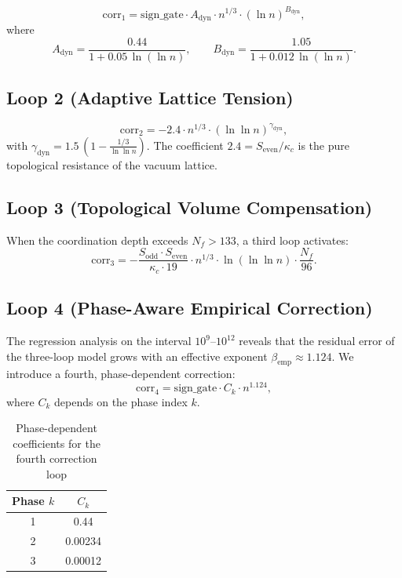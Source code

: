 \documentclass[12pt,a4paper]{article}
\theoremstyle{remark}
\newcommand{\kappac}{\kappa_c}
\newcommand{\Sodd}{S_{\mathrm{odd}}}
\newcommand{\Seven}{S_{\mathrm{even}}}
\begin{document}
	\[
	\mathrm{corr}_1 = \mathrm{sign\_gate} \cdot A_{\mathrm{dyn}} \cdot n^{1/3} \cdot (\ln n)^{B_{\mathrm{dyn}}},
	\]
	where
	\[
	A_{\mathrm{dyn}} = \frac{0.44}{1 + 0.05\,\ln(\ln n)}, \qquad
	B_{\mathrm{dyn}} = \frac{1.05}{1 + 0.012\,\ln(\ln n)}.
	\]
	
	\subsection{Loop 2 (Adaptive Lattice Tension)}
	
	\[
	\mathrm{corr}_2 = -2.4 \cdot n^{1/3} \cdot (\ln\ln n)^{\gamma_{\mathrm{dyn}}},
	\]
	with \(\gamma_{\mathrm{dyn}} = 1.5\,(1 - \frac{1/3}{\ln\ln n})\). The coefficient \(2.4 = \Seven/\kappac\) is the pure topological resistance of the vacuum lattice.
	
	\subsection{Loop 3 (Topological Volume Compensation)}
	
	When the coordination depth exceeds \(N_f > 133\), a third loop activates:
	\[
	\mathrm{corr}_3 = -\frac{\Sodd\cdot\Seven}{\kappac\cdot 19} \cdot n^{1/3} \cdot \ln(\ln\ln n) \cdot \frac{N_f}{96}.
	\]
	
	\subsection{Loop 4 (Phase-Aware Empirical Correction)}
	
	The regression analysis on the interval \(10^9\)--\(10^{12}\) reveals that the residual error of the three-loop model grows with an effective exponent \(\beta_{\mathrm{emp}} \approx 1.124\). We introduce a fourth, phase-dependent correction:
	\[
	\mathrm{corr}_4 = \mathrm{sign\_gate} \cdot C_k \cdot n^{1.124},
	\]
	where \(C_k\) depends on the phase index \(k\).
	
	\begin{table}[H]
		\centering
		\caption{Phase-dependent coefficients for the fourth correction loop}
		\label{tab:phase-coeffs}
		\begin{tabular}{cc}
			\toprule
			Phase \(k\) & \(C_k\) \\
			\midrule
			1 & 0.44 \\
			2 & 0.00234 \\
			3 & 0.00012 \\
			\bottomrule
		\end{tabular}
	\end{table}
	
\end{document}
